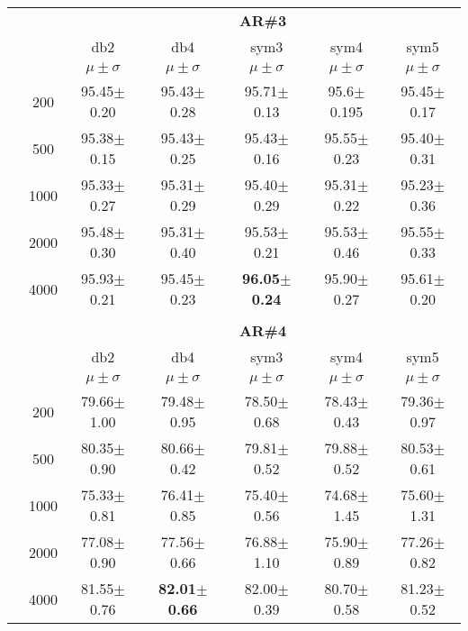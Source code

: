 \begin{table}[H]
\begin{tabular}{|c|c|c c c c c|}

\cline{3-7}
\multicolumn{2}{c|}{\multirow{3}{*}{}} & \multicolumn{5}{c|}{\textbf{AR\#3}}   \\\cline{3-7} 
\multicolumn{2}{c|}{}  & db2 & db4 & sym3 & sym4 & sym5 \\\cline{3-7}%
\multicolumn{2}{c|}{}& $\mu \pm \sigma$ & $\mu \pm \sigma$ & $\mu \pm \sigma$ & $\mu \pm \sigma$ & $\mu \pm \sigma$ \\\hline

\multicolumn{1}{|c|}{ \multirow{5}{*}{\rotatebox[origin=c]{90}{\textbf{Neurônios}}} }
& 200	&95.45$\pm$0.20	&95.43$\pm$0.28	&95.71$\pm$0.13	&95.6$\pm$0.195	&95.45$\pm$0.17	\\\cline{2-7}
& 500	&95.38$\pm$0.15	&95.43$\pm$0.25	&95.43$\pm$0.16	&95.55$\pm$0.23	&95.40$\pm$0.31	\\\cline{2-7}
& 1000	&95.33$\pm$0.27	&95.31$\pm$0.29	&95.40$\pm$0.29	&95.31$\pm$0.22	&95.23$\pm$0.36	\\\cline{2-7}
& 2000	&95.48$\pm$0.30	&95.31$\pm$0.40	&95.53$\pm$0.21	&95.53$\pm$0.46	&95.55$\pm$0.33	\\\cline{2-7}
& 4000	&95.93$\pm$0.21	&95.45$\pm$0.23	&\textbf{96.05$\pm$0.24}	&95.90$\pm$0.27	&95.61$\pm$0.20	
 
\\\midrule

\multicolumn{7}{c}{}\\ 



\cline{3-7}
\multicolumn{2}{c|}{\multirow{3}{*}{}} & \multicolumn{5}{c|}{\textbf{AR\#4}}   \\\cline{3-7} 
\multicolumn{2}{c|}{}  & db2 & db4 & sym3 & sym4 & sym5 \\\cline{3-7}%
\multicolumn{2}{c|}{}& $\mu \pm \sigma$ & $\mu \pm \sigma$ & $\mu \pm \sigma$ & $\mu \pm \sigma$ & $\mu \pm \sigma$ \\\hline
&200	&79.66$\pm$1.00	&79.48$\pm$0.95	&78.50$\pm$0.68	&78.43$\pm$0.43	&79.36$\pm$0.97	\\\cline{2-7}
&500	&80.35$\pm$0.90	&80.66$\pm$0.42	&79.81$\pm$0.52	&79.88$\pm$0.52	&80.53$\pm$0.61	\\\cline{2-7}
&1000	&75.33$\pm$0.81	&76.41$\pm$0.85	&75.40$\pm$0.56	&74.68$\pm$1.45	&75.60$\pm$1.31	\\\cline{2-7}
&2000	&77.08$\pm$0.90	&77.56$\pm$0.66	&76.88$\pm$1.10	&75.90$\pm$0.89	&77.26$\pm$0.82	\\\cline{2-7}
&4000	&81.55$\pm$0.76	&\textbf{82.01$\pm$0.66}	&82.00$\pm$0.39	&80.70$\pm$0.58	&81.23$\pm$0.52	
 

\\\midrule
\end{tabular}
\end{table}





